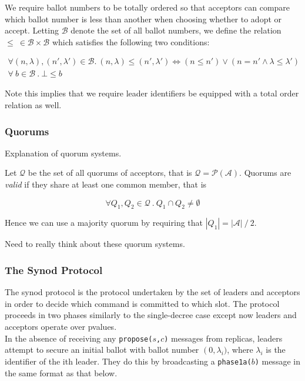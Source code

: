 We require ballot numbers to be totally ordered so that acceptors can compare which ballot number is less than another when choosing whether to adopt or accept. Letting $\mathcal{B}$ denote the set of all ballot numbers, we define the relation $\leq \ \in \mathcal{B} \times \mathcal{B}$ which satisfies the following two conditions:

\begin{gather}
  \forall \left( n, \lambda \right), \left( n', \lambda' \right) \in \mathcal{B} .
 \ \left( n, \lambda \right) \leq \left( n', \lambda' \right) \iff
   \left ( n \leq n' \right) \vee \left( n = n' \wedge \lambda \leq \lambda' \right) \\
\forall \ b \in \mathcal{B} \ . \ \bot \leq b
\end{gather}  

Note this implies that we require leader identifiers be equipped with a total order relation as well.


\subsubsection{Quorums}

Explanation of quorum systems. \\

{\color{red}
Let $\mathcal{Q}$ be the set of all quorums of acceptors, that is $\mathcal{Q} = \mathcal{P \left( \mathcal{A} \right)} $. Quorums are \emph{valid} if they share at least one common member, that is

$$\forall Q_1, Q_2 \in \mathcal{Q} \ . \ Q_1 \cap Q_2 \neq \emptyset$$

Hence we can use a majority quorum by requiring that $|Q_1| = |\mathcal{A}| \ / \ 2$.

Need to really think about these quorum systems.}



\subsubsection{The Synod Protocol}

The synod protocol is the protocol undertaken by the set of leaders and acceptors in order to decide which command is committed to which slot. The protocol proceeds in two phases similarly to the single-decree case except now leaders and acceptors operate over pvalues. \\

In the absence of receiving any \texttt{propose($s$,$c$)} messages from replicas, leaders attempt to secure an initial ballot with ballot number $\left(0, \lambda_i)$, where $\lambda_i$ is the identifier of the {\color{red}ith} leader. They do this by broadcasting a \texttt{phase1a($b$)} message in the same format as that below. \\

